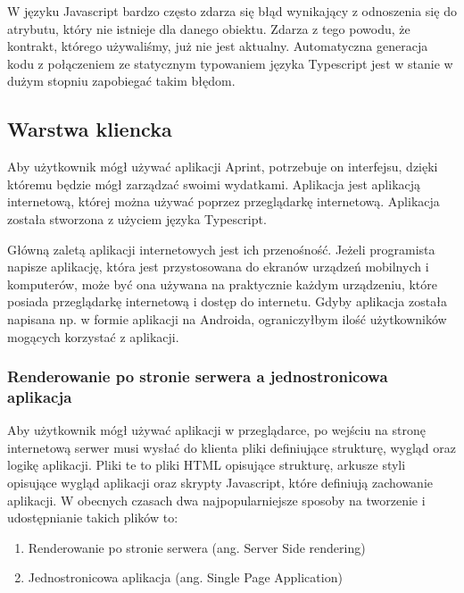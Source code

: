 W języku Javascript bardzo często zdarza się błąd wynikający z odnoszenia się do atrybutu, który nie istnieje dla danego obiektu. Zdarza z tego powodu, że kontrakt, którego używaliśmy, już nie jest aktualny. Automatyczna generacja kodu z połączeniem ze statycznym typowaniem języka Typescript jest w stanie w dużym stopniu zapobiegać takim błędom.

\subsection{Warstwa kliencka}
Aby użytkownik mógł używać aplikacji Aprint, potrzebuje on interfejsu, dzięki któremu będzie mógł zarządzać swoimi wydatkami. Aplikacja jest aplikacją internetową, której można używać poprzez przeglądarkę internetową. Aplikacja została stworzona z użyciem języka Typescript.

Główną zaletą aplikacji internetowych jest ich przenośność. Jeżeli programista napisze aplikację, która jest przystosowana do ekranów urządzeń mobilnych i komputerów, może być ona używana na praktycznie każdym urządzeniu, które posiada przeglądarkę internetową i dostęp do internetu. Gdyby aplikacja została napisana np. w formie aplikacji na Androida, ograniczyłbym ilość użytkowników mogących korzystać z aplikacji.
\subsubsection{Renderowanie po stronie serwera a jednostronicowa aplikacja}
Aby użytkownik mógł używać aplikacji w przeglądarce, po wejściu na stronę internetową serwer musi wysłać do klienta pliki definiujące strukturę, wygląd oraz logikę aplikacji. Pliki te to pliki HTML opisujące strukturę, arkusze styli opisujące wygląd aplikacji oraz skrypty Javascript, które definiują zachowanie aplikacji.
W obecnych czasach dwa najpopularniejsze sposoby na tworzenie i udostępnianie takich plików to:
\begin{enumerate}
  \item Renderowanie po stronie serwera (ang. Server Side rendering)
  \item Jednostronicowa aplikacja (ang. Single Page Application)
\end{enumerate}

